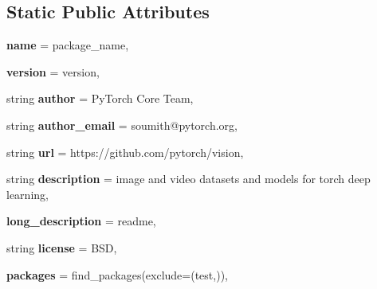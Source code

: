 \subsection*{Static Public Attributes}
\begin{DoxyCompactItemize}
\item 
\mbox{\label{classsetup_1_1clean_aeb31362a957edc39c6374808416c7edc}} 
{\bfseries name} = package\+\_\+name,
\item 
\mbox{\label{classsetup_1_1clean_a0457831314845d5063cf4896f1a4dab0}} 
{\bfseries version} = version,
\item 
\mbox{\label{classsetup_1_1clean_a157a038d4962f1a0e566042ac2a6cc4a}} 
string {\bfseries author} = \textquotesingle{}Py\+Torch Core Team\textquotesingle{},
\item 
\mbox{\label{classsetup_1_1clean_aeea4353bb8c79a3ca697a4740c6f35b6}} 
string {\bfseries author\+\_\+email} = \textquotesingle{}soumith@pytorch.\+org\textquotesingle{},
\item 
\mbox{\label{classsetup_1_1clean_a2323a8593c70904962b35f90b1aba130}} 
string {\bfseries url} = \textquotesingle{}https\+://github.\+com/pytorch/vision\textquotesingle{},
\item 
\mbox{\label{classsetup_1_1clean_a93800dfcfb87a62fc938e84488fbaa73}} 
string {\bfseries description} = \textquotesingle{}image and video datasets and models for torch deep learning\textquotesingle{},
\item 
\mbox{\label{classsetup_1_1clean_a6fe4ba47f23aa92d0df047bb2aa51594}} 
{\bfseries long\+\_\+description} = readme,
\item 
\mbox{\label{classsetup_1_1clean_aa763cde93281d6e15b67b3b9d6742d6a}} 
string {\bfseries license} = \textquotesingle{}B\+SD\textquotesingle{},
\item 
\mbox{\label{classsetup_1_1clean_a5e61a076a4320a3ae6a3eeaf347e97e7}} 
{\bfseries packages} = find\+\_\+packages(exclude=(\textquotesingle{}test\textquotesingle{},)),

\end{DoxyCompactItemize}
